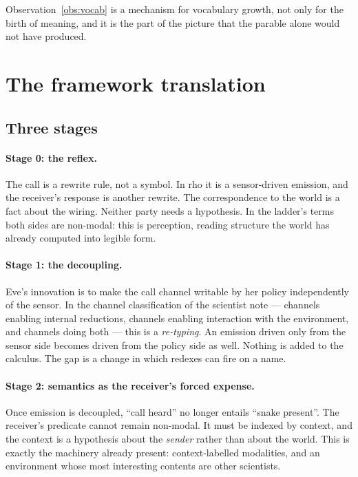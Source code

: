 \documentclass[11pt]{article}
\theoremstyle{plain}
\theoremstyle{definition}
\newcommand{\rhoc}{\textsf{rho}}
\begin{document}
Observation~\ref{obs:vocab} is a mechanism for vocabulary growth, not only for the birth of meaning, and
it is the part of the picture that the parable alone would not have produced.

\section{The framework translation}
\label{sec:translation}

\subsection{Three stages}

\paragraph{Stage 0: the reflex.} The call is a rewrite rule, not a symbol. In \rhoc{} it is a
sensor-driven emission, and the receiver's response is another rewrite. The correspondence to the world
is a fact about the wiring. Neither party needs a hypothesis. In the ladder's terms both sides are
non-modal: this is perception, reading structure the world has already computed into legible form.

\paragraph{Stage 1: the decoupling.} Eve's innovation is to make the call channel writable by her policy
independently of the sensor. In the channel classification of the scientist note --- channels enabling
internal reductions, channels enabling interaction with the environment, and channels doing both ---
this is a \emph{re-typing}. An emission driven only from the sensor side becomes driven from the policy
side as well. Nothing is added to the calculus. The gap is a change in which redexes can fire on a name.

\paragraph{Stage 2: semantics as the receiver's forced expense.} Once emission is decoupled, ``call
heard'' no longer entails ``snake present''. The receiver's predicate cannot remain non-modal. It must
be indexed by context, and the context is a hypothesis about the \emph{sender} rather than about the
world. This is exactly the machinery already present: context-labelled modalities, and an environment
whose most interesting contents are other scientists.
\end{document}
